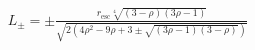 \documentclass[preview]{standalone}
\begin{document}
\begin{align*}
L_\pm=\pm\frac{r_{\text{esc}}\sqrt[4]{(3-\rho)(3\rho-1)}}{\sqrt{2\left(4\rho^2-9\rho+3\pm\sqrt{(3\rho-1)(3-\rho)}\right)}}
\end{align*}
\end{document}
